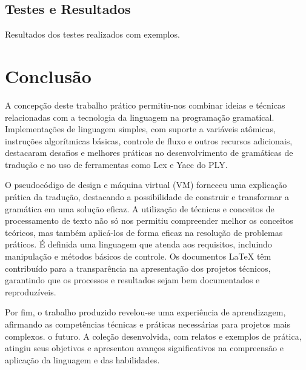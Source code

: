 \documentclass[12pt,a4paper]{report}
\begin{document}
\section{Testes e Resultados}
Resultados dos testes realizados com exemplos.

\chapter{Conclus\~{a}o}
A concepção deste trabalho prático permitiu-nos combinar ideias e técnicas relacionadas com a tecnologia da linguagem na programação gramatical. Implementações de linguagem simples, com suporte a variáveis atômicas, instruções algorítmicas básicas, controle de fluxo e outros recursos adicionais, destacaram desafios e melhores práticas no desenvolvimento de gramáticas de tradução e no uso de ferramentas como Lex e Yacc do PLY.

O pseudocódigo de design e máquina virtual (VM) forneceu uma explicação prática da tradução, destacando a possibilidade de construir e transformar a gramática em uma solução eficaz. A utilização de técnicas e conceitos de processamento de texto não só nos permitiu compreender melhor os conceitos teóricos, mas também aplicá-los de forma eficaz na resolução de problemas práticos. É definida uma linguagem que atenda aos requisitos, incluindo manipulação e métodos básicos de controle. Os documentos LaTeX têm contribuído para a transparência na apresentação dos projetos técnicos, garantindo que os processos e resultados sejam bem documentados e reproduzíveis.

Por fim, o trabalho produzido revelou-se uma experiência de aprendizagem, afirmando as competências técnicas e práticas necessárias para projetos mais complexos. o futuro. A coleção desenvolvida, com relatos e exemplos de prática, atingiu seus objetivos e apresentou avanços significativos na compreensão e aplicação da linguagem e das habilidades.
\end{document}

